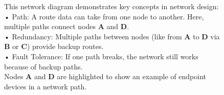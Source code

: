 \begin{figure}[h!]
    \centering
    \captionsetup{list=no}
    \caption{
        This network diagram demonstrates key concepts in network design:\protect\\
        • Path: A route data can take from one node to another. Here, multiple paths connect nodes \textbf{A} and \textbf{D}.\protect\\
        • Redundancy: Multiple paths between nodes (like from \textbf{A} to \textbf{D} via \textbf{B} or \textbf{C}) provide backup routes.\protect\\
        • Fault Tolerance: If one path breaks, the network still works because of backup paths.\protect\\
        Nodes \textbf{A} and \textbf{D} are highlighted to show an example of endpoint devices in a network path.
    }
\end{figure}



